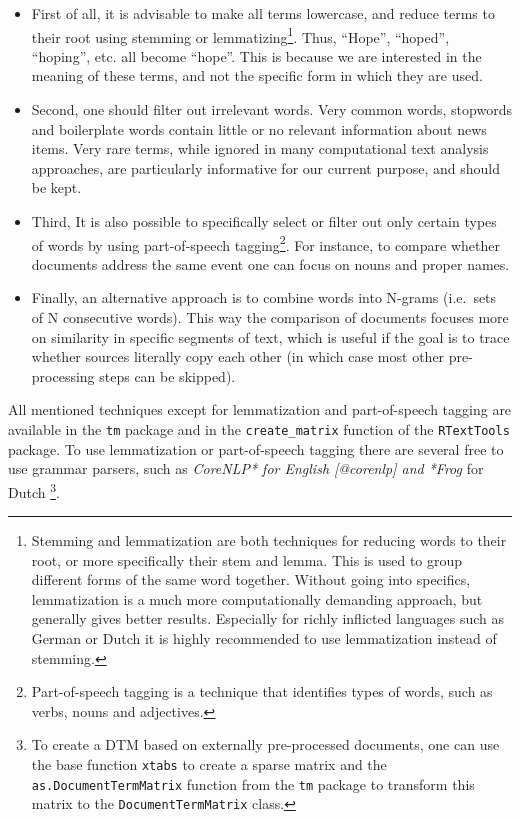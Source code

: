 \begin{itemize}
\item
  First of all, it is advisable to make all terms lowercase, and reduce
  terms to their root using stemming or lemmatizing\footnote{Stemming
    and lemmatization are both techniques for reducing words to their
    root, or more specifically their stem and lemma. This is used to
    group different forms of the same word together. Without going into
    specifics, lemmatization is a much more computationally demanding
    approach, but generally gives better results. Especially for richly
    inflicted languages such as German or Dutch it is highly recommended
    to use lemmatization instead of stemming.}. Thus, ``Hope'',
  ``hoped'', ``hoping'', etc. all become ``hope''. This is because we
  are interested in the meaning of these terms, and not the specific
  form in which they are used.
\item
  Second, one should filter out irrelevant words. Very common words,
  stopwords and boilerplate words contain little or no relevant
  information about news items. Very rare terms, while ignored in many
  computational text analysis approaches, are particularly informative
  for our current purpose, and should be kept.
\item
  Third, It is also possible to specifically select or filter out only
  certain types of words by using part-of-speech tagging\footnote{Part-of-speech
    tagging is a technique that identifies types of words, such as
    verbs, nouns and adjectives.}. For instance, to compare whether
  documents address the same event one can focus on nouns and proper
  names.
\item
  Finally, an alternative approach is to combine words into N-grams
  (i.e.~sets of N consecutive words). This way the comparison of
  documents focuses more on similarity in specific segments of text,
  which is useful if the goal is to trace whether sources literally copy
  each other (in which case most other pre-processing steps can be
  skipped).
\end{itemize}

All mentioned techniques except for lemmatization and part-of-speech
tagging are available in the \texttt{tm} package and in the
\texttt{create\_matrix} function of the \texttt{RTextTools} package. To
use lemmatization or part-of-speech tagging there are several free to
use grammar parsers, such as
\emph{CoreNLP* for English [@corenlp] and *Frog} for Dutch
\citep{bosch07}\footnote{To create a DTM based on externally
  pre-processed documents, one can use the base function \texttt{xtabs}
  to create a sparse matrix and the \texttt{as.DocumentTermMatrix}
  function from the \texttt{tm} package to transform this matrix to the
  \texttt{DocumentTermMatrix} class.}.


